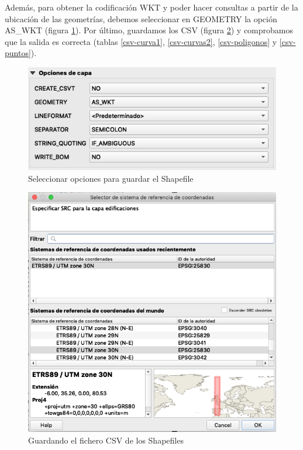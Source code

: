 Además, para obtener la codificación WKT y poder hacer consultas a partir de la ubicación de las geometrías, debemos seleccionar en GEOMETRY la opción AS\_WKT (figura \ref{fig:opciones}). Por último, guardamos los CSV (figura \ref{fig:guardar}) y comprobamos que la salida es correcta (tablas \ref{csv-curva1}, \ref{csv-curvas2}, \ref{csv-poligonos} y \ref{csv-puntos}).


\begin{figure}[H]
	\centering
	\includegraphics[width=0.6\linewidth]{imagenes/capitulo5/opciones}
	\caption{Seleccionar opciones para guardar el Shapefile}
	\label{fig:opciones}
\end{figure}

\begin{figure}[H]
	\centering
	\includegraphics[width=0.6\linewidth]{imagenes/capitulo5/guardar}
	\caption{Guardando el fichero CSV de los Shapefiles}
	\label{fig:guardar}
\end{figure}

